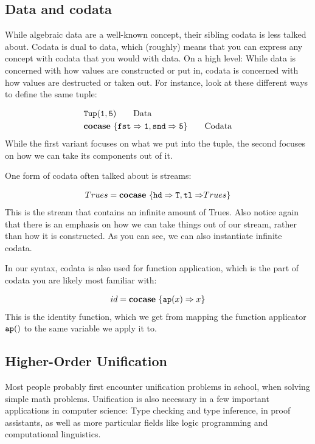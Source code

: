 \documentclass[twoside,12pt,a4paper]{article}
\begin{document}
\subsection{Data and codata}
While algebraic data are a well-known concept, their sibling codata is less talked about. 
Codata is dual to data, which (roughly) means that you can express any concept with codata that you would with data.
On a high level: While data is concerned with how values are constructed or put in, codata is concerned with how values are destructed or taken out. 
For instance, look at these different ways to define the same tuple: 

\begin{example}
    \begin{align*}
        &\mathtt{Tup(}\mathtt{1,5}\mathtt{)} \tag*{Data}\\
        &\textbf{cocase}\ \{\mathtt{fst \Rightarrow 1}, \mathtt{snd \Rightarrow 5}\} \tag*{Codata}
    \end{align*}     
    While the first variant focuses on what we put into the tuple, the second focuses on how we can take its components out of it.   
\end{example}

One form of codata often talked about is streams:
\begin{example}[Streams]
    \begin{align*}
        Trues = \textbf{cocase}\ \{\mathtt{hd \Rightarrow T, tl \Rightarrow} Trues\}
    \end{align*}
    This is the stream that contains an infinite amount of Trues.
    Also notice again that there is an emphasis on how we can take things out of our stream, rather than how it is constructed.
    As you can see, we can also instantiate infinite codata. 
\end{example}
In our syntax, codata is also used for function application, 
which is the part of codata you are likely most familiar with:

\begin{example}
    \begin{align*}
        id = \textbf{cocase}\ \{\texttt{ap}(x)\Rightarrow x\}
    \end{align*}
    This is the identity function, which we get from mapping the function applicator $\texttt{ap}()$ to the same variable we apply it to.
\end{example}
    
\subsection{Higher-Order Unification}
Most people probably first encounter unification problems in school, when solving simple math problems.
Unification is also necessary in a few important applications in computer science: 
Type checking and type inference, in proof assistants, as well as more particular fields like logic programming and computational linguistics.
\end{document}
